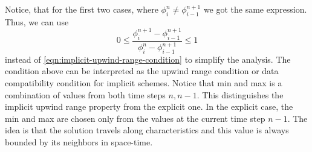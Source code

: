 \documentclass[../thesis.tex]{subfiles}
\begin{document}
Notice, that for the first two cases, where \(\phi_{i}^{n} \neq \phi_{i-1}^{n+1}\) we got the same expression.
Thus, we can use
\begin{equation}\label{eqn:upwind-range-simpler}
    0
    \leq
    \frac{\phi_{i}^{n+1} - \phi_{i-1}^{n+1}}{\phi_{i}^{n} - \phi_{i-1}^{n+1}}
    \leq
    1
\end{equation}
instead of \eqref{eqn:implicit-upwind-range-condition} to simplify the analysis.
The condition above can be interpreted as the upwind range condition\cite{1998_Laney_BOOK}
or data compatibility condition \cite{2009_Toro_BOOK} for implicit schemes.
Notice that min and max is a combination of values from both time steps \(n, n-1\).
This distinguishes the implicit upwind range property from the explicit one.
In the explicit case, the min and max are chosen only from the values at the current time step \(n-1\).
The idea is that the solution travels along characteristics and this value is always bounded by its neighbors in space-time.
\end{document}
